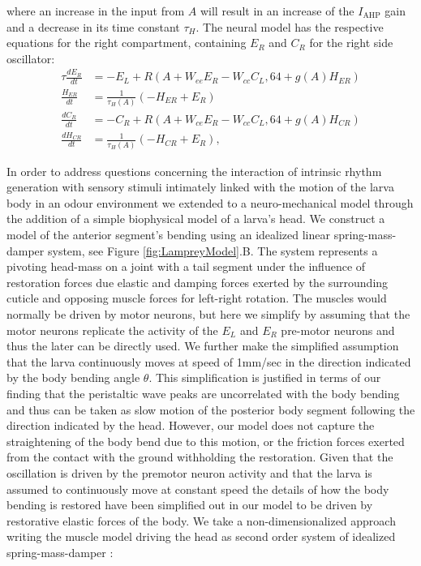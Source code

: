 \documentclass[11pt,a4paper]{article}
\begin{document}
where an increase in the input from $A$ will result in an increase of the $I_{\text{AHP}}$ gain and a decrease in its time constant $\tau_H$.
 The neural model has the respective equations for the right compartment, containing  $E_R$ and $C_R$ for the right side oscillator:
\begin{align}
\tau \frac{dE_R}{dt} & = - E_L +  R( A + W_{ee} E_R - W_{cc}C_L, 64 + g(A)H_{ER})\\
\frac{H_{ER}}{dt} &= \frac{1}{\tau_H(A)}(-H_{ER}+E_R)\\
\frac{dC_R}{dt} &= -C_R + R( A + W_{ce}E_R - W_{cc}C_L, 64+g(A)H_{CR})\\
\frac{dH_{CR}}{dt} &= \frac{1}{\tau_H(A)}(-H_{CR}+E_R),
\end{align}

In order to address questions concerning the interaction of intrinsic rhythm generation with sensory stimuli intimately linked with the motion of the larva body in an odour environment we extended to a neuro-mechanical model through the addition of a simple biophysical model of a larva's head. We construct a model of the anterior segment's bending using an idealized linear spring-mass-damper system, see Figure \ref{fig:LampreyModel}.B. The system represents a pivoting head-mass on a joint with a tail segment under the influence of restoration forces due elastic and damping forces exerted by the surrounding cuticle and opposing muscle forces for left-right rotation. The muscles would normally be driven by motor neurons, but here we simplify by assuming that the motor neurons replicate the activity of the $E_L$ and $E_R$ pre-motor neurons and thus the later can be directly used.
We further make the simplified assumption that the larva continuously moves at speed of 1mm/sec in the direction indicated by the body bending angle $\theta$. This simplification is justified in terms of our finding that the peristaltic wave peaks are uncorrelated with the body bending and thus can be taken as slow motion of the posterior body segment following the direction indicated by the head. However, our model does not capture the straightening of the body bend due to this motion, or the friction forces exerted from the contact with the ground withholding the restoration. Given that the oscillation is driven by the premotor neuron activity and that the larva is assumed to continuously move at constant speed the details of how the body bending is restored have been simplified out in our model to be driven by restorative elastic forces of the body. 
 We take a non-dimensionalized approach writing the muscle model driving the head as second order system of idealized spring-mass-damper \cite[see][]{fung2013biomechanics}:
\end{document}
